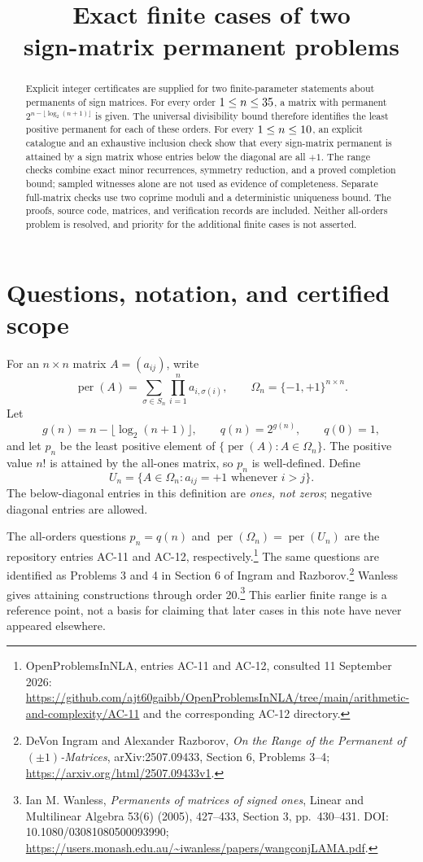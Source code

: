 \documentclass[11pt,a4paper]{article}
\title{Exact finite cases of two\\sign-matrix permanent problems}
\author{}
\date{}
\theoremstyle{remark}\newtheorem{remark}[theorem]{Remark}
\DeclareMathOperator{\per}{per}
\newcommand{\Om}{\Omega}
\begin{document}
\maketitle
\vspace{-2em}
\begin{abstract}
Explicit integer certificates are supplied for two finite-parameter statements about permanents of sign matrices. For every order $1\leq n\leq35$, a matrix with permanent $2^{n-\lfloor\log_2(n+1)\rfloor}$ is given. The universal divisibility bound therefore identifies the least positive permanent for each of these orders. For every $1\leq n\leq10$, an explicit catalogue and an exhaustive inclusion check show that every sign-matrix permanent is attained by a sign matrix whose entries below the diagonal are all $+1$. The range checks combine exact minor recurrences, symmetry reduction, and a proved completion bound; sampled witnesses alone are not used as evidence of completeness. Separate full-matrix checks use two coprime moduli and a deterministic uniqueness bound. The proofs, source code, matrices, and verification records are included. Neither all-orders problem is resolved, and priority for the additional finite cases is not asserted.
\end{abstract}

\section{Questions, notation, and certified scope}
For an $n\times n$ matrix $A=(a_{ij})$, write
\[
 \per(A)=\sum_{\sigma\in S_n}\prod_{i=1}^n a_{i,\sigma(i)},\qquad
 \Om_n=\{-1,+1\}^{n\times n}.
\]
Let
\[
 g(n)=n-\lfloor\log_2(n+1)\rfloor,\qquad q(n)=2^{g(n)},\qquad q(0)=1,
\]
and let $p_n$ be the least positive element of $\{\per(A):A\in\Om_n\}$. The positive value $n!$ is attained by the all-ones matrix, so $p_n$ is well-defined. Define
\[
 U_n=\{A\in\Om_n:a_{ij}=+1\text{ whenever }i>j\}.
\]
The below-diagonal entries in this definition are \emph{ones, not zeros}; negative diagonal entries are allowed.

The all-orders questions $p_n=q(n)$ and $\per(\Om_n)=\per(U_n)$ are the repository entries AC-11 and AC-12, respectively.\footnote{OpenProblemsInNLA, entries AC-11 and AC-12, consulted 11 September 2026: \url{https://github.com/ajt60gaibb/OpenProblemsInNLA/tree/main/arithmetic-and-complexity/AC-11} and the corresponding AC-12 directory.} The same questions are identified as Problems 3 and 4 in Section 6 of Ingram and Razborov.\footnote{DeVon Ingram and Alexander Razborov, \emph{On the Range of the Permanent of $(\pm1)$-Matrices}, arXiv:2507.09433, Section 6, Problems 3--4; \url{https://arxiv.org/html/2507.09433v1}.} Wanless gives attaining constructions through order 20.\footnote{Ian M. Wanless, \emph{Permanents of matrices of signed ones}, Linear and Multilinear Algebra 53(6) (2005), 427--433, Section 3, pp.\ 430--431. DOI: 10.1080/03081080500093990; \url{https://users.monash.edu.au/~iwanless/papers/wangconjLAMA.pdf}.} This earlier finite range is a reference point, not a basis for claiming that later cases in this note have never appeared elsewhere.
\end{document}
